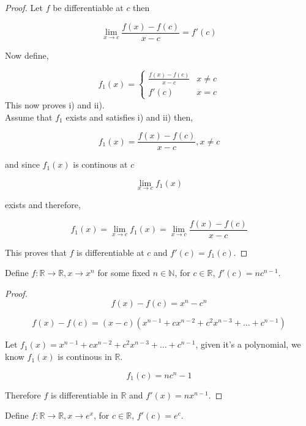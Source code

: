 \documentclass[11pt,a4paper]{colorart}
\def\l{\left}
\def\r{\right}
\def\R{\mathbb{R}}
\def\N{\mathbb{N}}
\def\ra{\rightarrow}
\begin{document}
\begin{proof}
	Let $f$ be differentiable at $c$ then
	
	\[ \lim_{ x \to c } \frac{ f(x) - f(c) }{ x - c} = f'(c) \]
	
	Now define, 

	\[ f_1(x) = \l\{ 
		\begin{array}{ll}
			\frac{ f(x) - f(c) }{ x -c } & x \neq c\\ 
	   		f'(c) & x=c 
		\end{array} 
		     \r. \]
	This now proves i) and ii).\\

	Assume that $f_1$ exists and satisfies i) and ii) then,
	
	\[ f_1(x) = \frac{ f(x) - f(c) }{ x-c }, x \neq c \]
	
	and since $f_1(x)$ is continous at $c$ 
	
	\[ \lim_{x \to c} f_1(x) \]
	
	exists and therefore,
	
	\[ f_1(x) = \lim_{ x \to c } f_1(x) = \lim_{x \to c} \frac{ f(x) - f(c) }{ x-c } \]

	This proves that $f$ is differentiable at $c$ and $f'(c) = f_1(c)$.
\end{proof}

\begin{example}
	Define $f: \R \ra \R, x \ra x^n$ for some fixed $n \in \N$, for $c \in \R$, $f'(c) = nc^{n-1}$.
\end{example}

\begin{proof}
	
	\[ f(x) - f(c) = x^n - c^n \]
	
	\[ f(x) - f(c) = ( x-c ) ( x^{n-1} + c x^{n-2} + c^2 x^{n-3} + \dots + c^{n-1} ) \]

	Let $f_1(x) = x^{n-1} + c x^{n-2} + c^2 x^{n-3} + \dots + c^{n-1}$, given it's a polynomial, we know $f_1(x)$ is continous in $\R$.

	\[ f_1(c) = nc^n-1 \]

	Therefore $f$ is differentiable in $\R$ and $f'(x) = nx^{n-1}$.

\end{proof}

\begin{example}
	Define $f: \R \ra \R, x \ra e^x$, for $c \in \R$, $f'(c) = e^c$.
\end{example}
	
\end{document}
